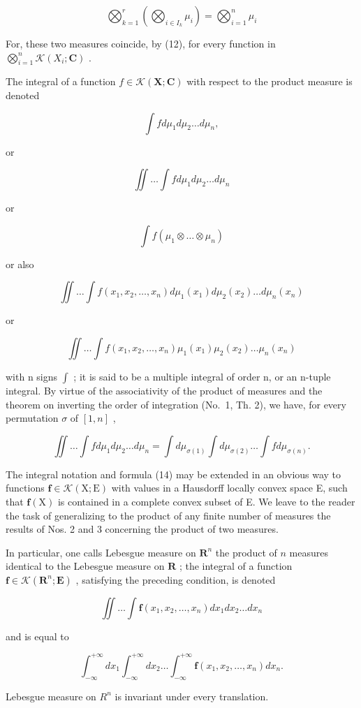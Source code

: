 \[
\bigotimes_ {k = 1} ^ {r} \left(\bigotimes_ {i \in I _ {k}} \mu_ {i}\right) = \bigotimes_ {i = 1} ^ {n} \mu_ {i}\tag{13}
\]

For, these two measures coincide, by (12), for every function in \(\bigotimes_ {i = 1} ^ {n} \mathcal{K}(X_{i}; \mathbf{C})\) .

The integral of a function \(f \in \mathcal{K}(\mathbf{X};\mathbf{C})\) with respect to the product measure is denoted

\[
\int f d \mu_ {1} d \mu_ {2} \dots d \mu_ {n},
\]

or

\[
\iint \ldots \int f d \mu_ {1} d \mu_ {2} \ldots d \mu_ {n}
\]

or

\[
\int f (\mu_ {1} \otimes \dots \otimes \mu_ {n})
\]

or also

\[
\iint \dots \int f (x _ {1}, x _ {2}, \dots , x _ {n}) d \mu_ {1} (x _ {1}) d \mu_ {2} (x _ {2}) \dots d \mu_ {n} (x _ {n})
\]

or

\[
\iint \dots \int f (x _ {1}, x _ {2}, \dots , x _ {n}) \mu_ {1} (x _ {1}) \mu_ {2} (x _ {2}) \dots \mu_ {n} (x _ {n})
\]

with n signs \(\int\) ; it is said to be a multiple integral of order n, or an n-tuple integral. By virtue of the associativity of the product of measures and the theorem on inverting the order of integration (No.~1, Th. 2), we have, for every permutation \(\sigma\) of \([1,n]\) ,

\[
\iint \dots \int f d \mu_ {1} d \mu_ {2} \dots d \mu_ {n} = \int d \mu_ {\sigma (1)} \int d \mu_ {\sigma (2)} \dots \int f d \mu_ {\sigma (n)}.\tag{14}
\]

The integral notation and formula (14) may be extended in an obvious way to functions \(\mathbf{f} \in \mathcal{K}(\mathrm{X};\mathrm{E})\) with values in a Hausdorff locally convex space E, such that \(\mathbf{f}(\mathrm{X})\) is contained in a complete convex subset of E. We leave to the reader the task of generalizing to the product of any finite number of measures the results of Nos. 2 and 3 concerning the product of two measures.

In particular, one calls Lebesgue measure on \(\mathbf{R}^n\) the product of \(n\) measures identical to the Lebesgue measure on \(\mathbf{R}\) ; the integral of a function \(\mathbf{f} \in \mathcal{K}(\mathbf{R}^n; \mathbf{E})\) , satisfying the preceding condition, is denoted

\[
\iint \dots \int \mathbf {f} (x _ {1}, x _ {2}, \dots , x _ {n}) d x _ {1} d x _ {2} \dots d x _ {n}
\]

and is equal to

\[
\int_ {- \infty} ^ {+ \infty} d x _ {1} \int_ {- \infty} ^ {+ \infty} d x _ {2} \dots \int_ {- \infty} ^ {+ \infty} \mathbf {f} (x _ {1}, x _ {2}, \dots , x _ {n}) d x _ {n}.
\]

Lebesgue measure on \(R^{n}\) is invariant under every translation.
\relax{}
